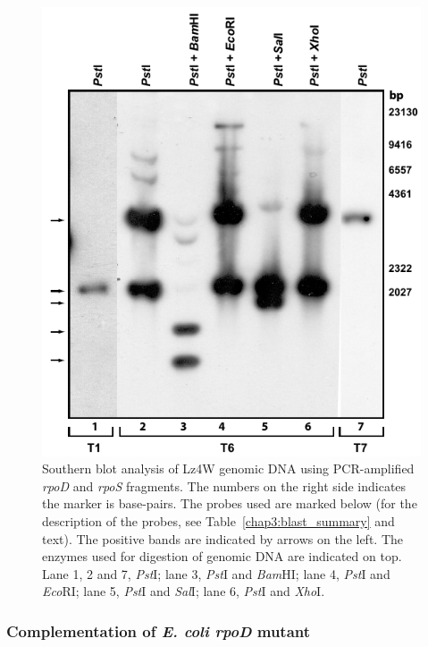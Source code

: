 \begin{figure}[tbp]
\centering
\includegraphics{figures/chap3_tprobe_southern.pdf}
\caption[Southern blot analysis using PCR-amplified \emph{rpoD}
and \emph{rpoS} fragments]{%
    Southern blot analysis of Lz4W genomic DNA using PCR-amplified \emph{rpoD} and \emph{rpoS}
    fragments. The numbers on the right side indicates the marker
    is base-pairs. The probes used are marked below (for the
    description of the probes, see
    Table~\ref{chap3:blast_summary} and text). The positive bands are indicated by arrows on the left. The enzymes used for digestion of genomic DNA are
    indicated on top. Lane 1, 2 and 7, \emph{Pst}I; lane 3,
    \emph{Pst}I and \emph{Bam}HI; lane 4, \emph{Pst}I and
    \emph{Eco}RI; lane 5, \emph{Pst}I and \emph{Sal}I; lane 6,
    \emph{Pst}I and \emph{Xho}I.}
\label{chap3:tprobes}
\end{figure}

\subsubsection{Complementation of \emph{E. coli rpoD} mutant}

